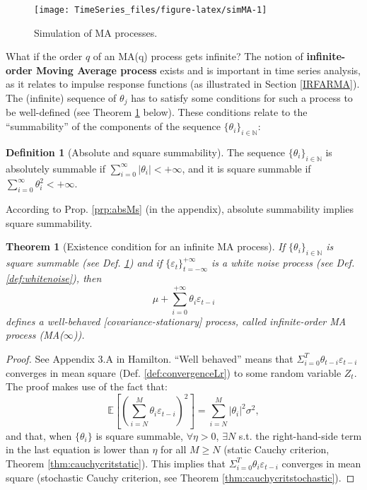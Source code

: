 \documentclass[
  12pt,
]{book}
\newtheorem{theorem}{Theorem}[chapter]
\theoremstyle{definition}
\newtheorem{definition}{Definition}[chapter]
\theoremstyle{definition}
\theoremstyle{definition}
\theoremstyle{definition}
\theoremstyle{remark}
\begin{document}
\begin{figure}
\texttt{[image: TimeSeries\_files/figure-latex/simMA-1]} \caption{Simulation of MA processes.}\label{fig:simMA}
\end{figure}

What if the order \(q\) of an MA(q) process gets infinite? The notion of \textbf{infinite-order Moving Average process} exists and is important in time series analysis, as it relates to impulse response functions (as illustrated in Section \ref{IRFARMA}). The (infinite) sequence of \(\theta_j\) has to satisfy some conditions for such a process to be well-defined (see Theorem \ref{thm:infMA} below). These conditions relate to the ``summability'' of the components of the sequence \(\{\theta_{i}\}_{i\in\mathbb{N}}\):

\begin{definition}[Absolute and square summability]
\protect\hypertarget{def:summability}{}\label{def:summability}The sequence \(\{\theta_{i}\}_{i\in\mathbb{N}}\) is absolutely summable if \(\sum_{i=0}^{\infty}|\theta_i| < + \infty\), and it is square summable if \(\sum_{i=0}^{\infty} \theta_i^2 < + \infty\).
\end{definition}

According to Prop. \ref{prp:absMs} (in the appendix), absolute summability implies square summability.

\begin{theorem}[Existence condition for an infinite MA process]
\protect\hypertarget{thm:infMA}{}\label{thm:infMA}If \(\{\theta_{i}\}_{i\in\mathbb{N}}\) is square summable (see Def. \ref{def:summability}) and if \(\{\varepsilon_t\}_{t = -\infty}^{+\infty}\) is a white noise process (see Def. \ref{def:whitenoise}), then
\[
\mu + \sum_{i=0}^{+\infty} \theta_{i} \varepsilon_{t-i}
\]
defines a well-behaved {[}covariance-stationary{]} process, called infinite-order MA process (MA(\(\infty\))).
\end{theorem}

\begin{proof}
See Appendix 3.A in Hamilton. ``Well behaved'' means that \(\Sigma_{i=0}^{T} \theta_{t-i} \varepsilon_{t-i}\) converges in mean square (Def. \ref{def:convergenceLr}) to some random variable \(Z_t\). The proof makes use of the fact that:
\[
\mathbb{E}\left[\left(\sum_{i=N}^{M}\theta_{i} \varepsilon_{t-i}\right)^2\right] = \sum_{i=N}^{M}|\theta_{i}|^2 \sigma^2,
\]
and that, when \(\{\theta_{i}\}\) is square summable, \(\forall \eta>0\), \(\exists N\) s.t. the right-hand-side term in the last equation is lower than \(\eta\) for all \(M \ge N\) (static Cauchy criterion, Theorem \ref{thm:cauchycritstatic}). This implies that \(\Sigma_{i=0}^{T} \theta_{i} \varepsilon_{t-i}\) converges in mean square (stochastic Cauchy criterion, see Theorem \ref{thm:cauchycritstochastic}).
\end{proof}
\end{document}
